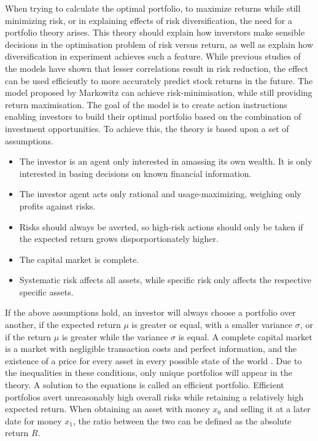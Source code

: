 When trying to calculate the optimal portfolio, to maximize returns while still minimizing risk, or in explaining effects of risk diversification, the need for a portfolio theory arises. This theory should explain how inverstors make sensible decisions in the optimisation problem of risk versus return, as well as explain how diversification in experiment achieves such a feature. While previous studies \cite{Markowitz_1952} of the models have shown that lesser correlations result in risk reduction, the effect can be used efficiently to more accurately predict stock returns in the future. The model proposed by Markowitz can achieve risk-minimisation, while still providing return maximisation. The goal of the model is to create action instructions enabling investors to build their optimal portfolio based on the combination of investment opportunities. To achieve this, the theory is based upon a set of assumptions.
\begin{itemize}%
	\item The investor is an agent only interested in amassing its own wealth. It is only interested in basing decisions on known financial information. 
	\item The investor agent acts only rational and usage-maximizing, weighing only profits against risks.
	\item Risks should always be averted, so high-risk actions should only be taken if the expected return grows disporportionately higher. 
	\item The capital market is complete. 
	\item Systematic risk affects all assets, while specific risk only affects the respective specific assets. 
\end{itemize}
If the above assumptions hold, an investor will always choose a portfolio over another, if the expected return $\mu$ is greater or equal, with a smaller variance $\sigma$, or if the return $\mu$ is greater while the variance $\sigma$ is equal. A complete capital market is a market with negligible transaction costs and perfect information, and the existence of a price for every asset in every possible state of the world \cite{Buckle_2018}. Due to the inequalities in these conditions, only unique portfolios will appear in the theory. A solution to the equations is called an efficient portfolio. Efficient portfolios avert unreasonably high overall risks while retaining a relatively high expected return.  \newline
When obtaining an asset with money $x_0$ and selling it at a later date for money $x_1$, the ratio between the two can be defined as the absolute return $R$. 
